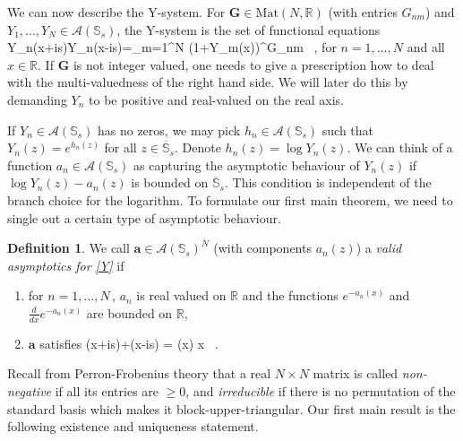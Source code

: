\documentclass[12pt]{article}
\theoremstyle{plain}
\theoremstyle{definition}
\newtheorem{definition}[theorem]{Definition}
\numberwithin{equation}{section}
\numberwithin{theorem}{section}
\def\be#1\ee{\begin{equation}#1\end{equation}}
\renewcommand{\vec}[1]{\mathbf{#1}}
\begin{document}
We can now describe the Y-system. For $\vec{G} \in \mathrm{Mat}(N,\mathbb{R})$ (with entries $G_{nm}$) and 
	$Y_1,\dots,Y_N \in \mathcal{A}(\mathbb{S}_s)$, 
the Y-system is the set of functional equations
\be\label{Y}
Y_n(x+is)Y_n(x-is)=\prod_{m=1}^N \left(1+Y_m(x)\right)^{G_{nm}}  \ , 
\ee
for $n=1,\dots,N$ and all $x \in \mathbb{R}$.
If $\vec{G}$ is not integer valued, one needs to give a prescription how to deal with the multi-valuedness of the right hand side. We will later do this by demanding $Y_n$ to be positive and real-valued on the real axis.

If $Y_n\in\mathcal{A}(\mathbb{S}_s)$ has no zeros,
we may pick $h_n\in\mathcal{A}(\mathbb{S}_s)$ such that $Y_n(z)=e^{h_n(z)}$ for all 
	$z\in\overline{\mathbb{S}}_s$. 
Denote $h_n(z)=\log Y_n(z)$. 
	We can think of a function $a_n\in\mathcal{A}(\mathbb{S}_s)$ as capturing the asymptotic behaviour of $Y_n(z)$ if $\log Y_n(z)-a_n(z)$ is bounded on 
	$\overline{\mathbb{S}}_s$. 
This condition is independent of the branch choice
	for the logarithm.
To formulate our first main theorem, we need to single out a certain type of asymptotic behaviour.

\begin{definition}
We call $\vec{a}\in\mathcal{A}(\mathbb{S}_s)^N$ (with components $a_n(z)$) 
	a {\sl valid asymptotics for \eqref{Y}} if
\begin{enumerate}
\item for $n=1,...,N\, $, $a_n$ is real valued on $\mathbb{R}$ and the functions $e^{-a_n(x)}$ and $\frac{d}{dx}e^{-a_n(x)}$ are bounded on $\mathbb{R}$,
\item $\vec a$ satisfies
\be\label{linear-eqn-for-asympt}
\vec{a}(x+is)+\vec{a}(x-is) = \vec{G}\cdot \vec{a}(x)
 \qquad {} x \in {} \ .
\ee
\end{enumerate}
\end{definition} 

Recall from Perron-Frobenius theory that
a real $N\times N$ matrix is called {\sl non-negative} if all its entries are $\ge 0$, and {\sl irreducible} if there is no permutation of the standard basis
which makes it block-upper-triangular.
Our first main result is the following existence and uniqueness statement.
\end{document}
